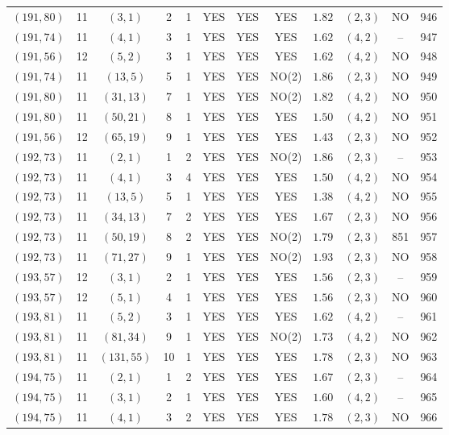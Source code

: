 \begin{longtable}{|c|c|c|c|c|c|c|c|c|c|c|c|}
$(191,80)$ & 11 & $(3,1)$ & 2 & 1 & YES & YES & YES & $1.82$ & $(2,3)$ & NO & 946\\
$(191,74)$ & 11 & $(4,1)$ & 3 & 1 & YES & YES & YES & $1.62$ & $(4,2)$ & -- & 947\\
$(191,56)$ & 12 & $(5,2)$ & 3 & 1 & YES & YES & YES & $1.62$ & $(4,2)$ & NO & 948\\
$(191,74)$ & 11 & $(13,5)$ & 5 & 1 & YES & YES & NO(2) & $1.86$ & $(2,3)$ & NO & 949\\
$(191,80)$ & 11 & $(31,13)$ & 7 & 1 & YES & YES & NO(2) & $1.82$ & $(4,2)$ & NO & 950\\
$(191,80)$ & 11 & $(50,21)$ & 8 & 1 & YES & YES & YES & $1.50$ & $(4,2)$ & NO & 951\\
$(191,56)$ & 12 & $(65,19)$ & 9 & 1 & YES & YES & YES & $1.43$ & $(2,3)$ & NO & 952\\
$(192,73)$ & 11 & $(2,1)$ & 1 & 2 & YES & YES & NO(2) & $1.86$ & $(2,3)$ & -- & 953\\
$(192,73)$ & 11 & $(4,1)$ & 3 & 4 & YES & YES & YES & $1.50$ & $(4,2)$ & NO & 954\\
$(192,73)$ & 11 & $(13,5)$ & 5 & 1 & YES & YES & YES & $1.38$ & $(4,2)$ & NO & 955\\
$(192,73)$ & 11 & $(34,13)$ & 7 & 2 & YES & YES & YES & $1.67$ & $(2,3)$ & NO & 956\\
$(192,73)$ & 11 & $(50,19)$ & 8 & 2 & YES & YES & NO(2) & $1.79$ & $(2,3)$ & 851 & 957\\
$(192,73)$ & 11 & $(71,27)$ & 9 & 1 & YES & YES & NO(2) & $1.93$ & $(2,3)$ & NO & 958\\
$(193,57)$ & 12 & $(3,1)$ & 2 & 1 & YES & YES & YES & $1.56$ & $(2,3)$ & -- & 959\\
$(193,57)$ & 12 & $(5,1)$ & 4 & 1 & YES & YES & YES & $1.56$ & $(2,3)$ & NO & 960\\
$(193,81)$ & 11 & $(5,2)$ & 3 & 1 & YES & YES & YES & $1.62$ & $(4,2)$ & -- & 961\\
$(193,81)$ & 11 & $(81,34)$ & 9 & 1 & YES & YES & NO(2) & $1.73$ & $(4,2)$ & NO & 962\\
$(193,81)$ & 11 & $(131,55)$ & 10 & 1 & YES & YES & YES & $1.78$ & $(2,3)$ & NO & 963\\
$(194,75)$ & 11 & $(2,1)$ & 1 & 2 & YES & YES & YES & $1.67$ & $(2,3)$ & -- & 964\\
$(194,75)$ & 11 & $(3,1)$ & 2 & 1 & YES & YES & YES & $1.60$ & $(4,2)$ & -- & 965\\
$(194,75)$ & 11 & $(4,1)$ & 3 & 2 & YES & YES & YES & $1.78$ & $(2,3)$ & NO & 966\\

\end{longtable}
